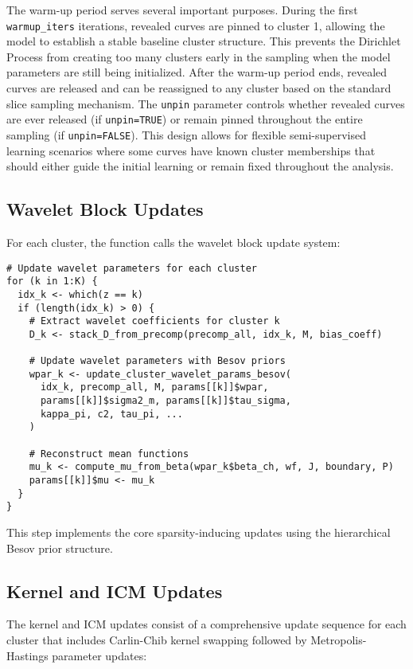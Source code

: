 \documentclass[11pt]{article}
\begin{document}
The warm-up period serves several important purposes. During the first \texttt{warmup\_iters} iterations, revealed curves are pinned to cluster 1, allowing the model to establish a stable baseline cluster structure. This prevents the Dirichlet Process from creating too many clusters early in the sampling when the model parameters are still being initialized. After the warm-up period ends, revealed curves are released and can be reassigned to any cluster based on the standard slice sampling mechanism. The \texttt{unpin} parameter controls whether revealed curves are ever released (if \texttt{unpin=TRUE}) or remain pinned throughout the entire sampling (if \texttt{unpin=FALSE}). This design allows for flexible semi-supervised learning scenarios where some curves have known cluster memberships that should either guide the initial learning or remain fixed throughout the analysis.

\subsection{Wavelet Block Updates}

For each cluster, the function calls the wavelet block update system:

\begin{lstlisting}
# Update wavelet parameters for each cluster
for (k in 1:K) {
  idx_k <- which(z == k)
  if (length(idx_k) > 0) {
    # Extract wavelet coefficients for cluster k
    D_k <- stack_D_from_precomp(precomp_all, idx_k, M, bias_coeff)
    
    # Update wavelet parameters with Besov priors
    wpar_k <- update_cluster_wavelet_params_besov(
      idx_k, precomp_all, M, params[[k]]$wpar,
      params[[k]]$sigma2_m, params[[k]]$tau_sigma,
      kappa_pi, c2, tau_pi, ...
    )
    
    # Reconstruct mean functions
    mu_k <- compute_mu_from_beta(wpar_k$beta_ch, wf, J, boundary, P)
    params[[k]]$mu <- mu_k
  }
}
\end{lstlisting}

This step implements the core sparsity-inducing updates using the hierarchical Besov prior structure.

\subsection{Kernel and ICM Updates}

The kernel and ICM updates consist of a comprehensive update sequence for each cluster that includes Carlin-Chib kernel swapping followed by Metropolis-Hastings parameter updates:
\end{document}
